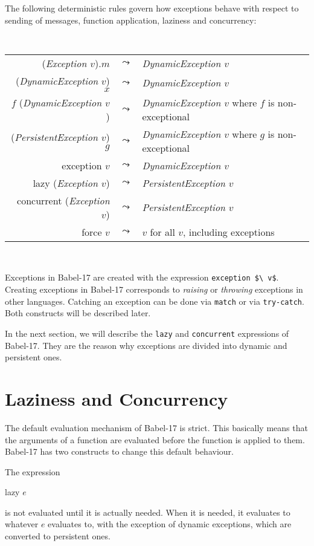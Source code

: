 \documentclass[11pt]{amsart}
\newcommand{\metababel}[1] {\textsl{#1}}
\newenvironment{babelcode}[0]{\begin{center}\tt}{\end{center}}
\newcommand{\babelsrc}[1] {\lstinline!#1!}
\begin{document}
The following deterministic rules govern how exceptions behave with respect to sending of messages, function application, laziness and concurrency:
\begin{babelcode}
\begin{tabular}{rcl}
(\metababel{Exception $v$}).$m$ & $\leadsto$ & \metababel{DynamicException $v$}\\
(\textsl{DynamicException} $v$) $x$ & $\leadsto$ & \metababel{DynamicException $v$}\\
$f$ (\metababel{DynamicException $v$}) & $\leadsto$ & \metababel{DynamicException $v$}  {\rm where $f$ is non-exceptional}\\
(\metababel{PersistentException $v$}) $g$ & $\leadsto$ & \metababel{DynamicException $v$}  {\rm where $g$ is non-exceptional}\\
exception $v$ & $\leadsto$ & \metababel{DynamicException $v$}\\
lazy (\metababel{Exception $v$}) & $\leadsto$ & \metababel{PersistentException $v$}\\
concurrent (\metababel{Exception $v$}) & $\leadsto$ & \metababel{PersistentException $v$}\\
force $v$  & $\leadsto$ & $v$  {\rm for all $v$, including exceptions}
\end{tabular}\\
\end{babelcode}
Exceptions in Babel-17 are created with the expression \babelsrc{exception $\ v$}. Creating exceptions in Babel-17 corresponds to \emph{raising} or \emph{throwing} exceptions in other languages. Catching an exception can be done via \babelsrc{match} or via \babelsrc{try-catch}. Both constructs will be described later.

In the next section, we will describe the  \babelsrc{lazy} and \babelsrc{concurrent} expressions of Babel-17. They are the reason why exceptions are divided into dynamic and persistent ones. 

\section{Laziness and Concurrency}
The default evaluation mechanism of Babel-17 is strict. This basically means that the arguments of a function are evaluated before the function is applied to them. Babel-17 has two constructs to change this default behaviour. 

The expression
\begin{babellisting}
lazy $e$
\end{babellisting}
is not evaluated until it is actually needed. When it is needed, it evaluates to whatever $e$ evaluates to, with the exception of dynamic exceptions, which are converted to persistent ones.  
\end{document}
